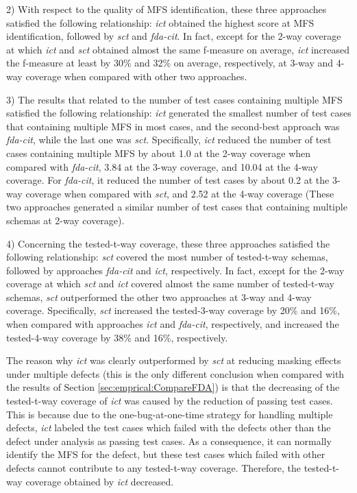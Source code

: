 \documentclass[journal,12pt,onecolumn,draftclsnofoot,]{IEEEtran}
\begin{document}
2) With respect to the quality of MFS identification, these three approaches satisfied the following relationship: \emph{ict} obtained the highest score at MFS identification, followed by \emph{sct} and \emph{fda-cit}. In fact, except for the 2-way coverage at which \emph{ict} and \emph{sct} obtained almost the same f-measure on average, \emph{ict} increased the f-measure at least by 30\% and 32\% on average, respectively, at 3-way and 4-way coverage when compared with other two approaches.


3) The results that related to the number of test cases containing multiple MFS satisfied the following relationship:  \emph{ict} generated the smallest number of test cases that containing multiple MFS {\color{red} in most cases}, and the second-best approach was \emph{fda-cit}, while the last one was \emph{sct}. Specifically, \emph{ict} reduced the number of test cases containing multiple MFS by about 1.0 at the 2-way coverage when compared with \emph{fda-cit}, 3.84 at the 3-way coverage, and 10.04 at the 4-way coverage. For \emph{fda-cit}, it reduced the number of test cases by about 0.2 at the 3-way coverage when compared with \emph{sct}, and 2.52 at the 4-way coverage (These two approaches generated a similar number of test cases that containing multiple schemas at 2-way coverage).

4) Concerning the tested-t-way coverage, these three approaches satisfied the following relationship: \emph{sct} covered the most number of tested-t-way schemas, followed by approaches \emph{fda-cit} and \emph{ict}, respectively. In fact, except for the 2-way coverage at which \emph{sct} and \emph{ict} covered almost the same number of tested-t-way schemas, \emph{sct} outperformed the other two approaches at 3-way and 4-way coverage.  Specifically, \emph{sct} increased the tested-3-way coverage by 20\% and 16\%, when compared with approaches \emph{ict} and \emph{fda-cit}, respectively, and increased the tested-4-way coverage by 38\% and 16\%, respectively.

The reason why \emph{ict} was clearly outperformed by \emph{sct} at reducing masking effects under multiple defects (this is the only different conclusion when compared with the results of Section \ref{sec:emprical:CompareFDA}) is that the decreasing of the tested-t-way coverage of \emph{ict} was caused by the reduction of passing test cases. This is because due to the one-bug-at-one-time strategy for handling multiple defects, \emph{ict} labeled the test cases which failed with the defects other than the defect under analysis as passing test cases. As a consequence, it can normally identify the MFS for the defect, but these test cases which failed with other defects cannot contribute to any tested-t-way coverage. Therefore, the tested-t-way coverage obtained by \emph{ict} decreased.
\end{document}
